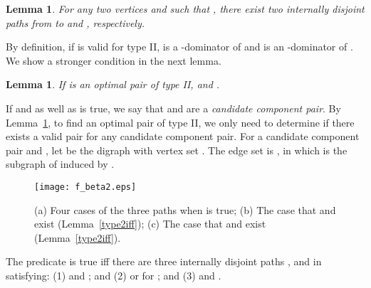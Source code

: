 \documentclass[review]{elsarticle}
\def\squarebox#1{\hbox to #1{\hfill\vbox to #1{\vfill}}}
\renewcommand{\qed}{\hspace*{\fill}
            \vbox{\hrule\hbox{\vrule\squarebox{.667em}\vrule}\hrule}\smallskip\newline}
\newtheorem{lem}[thm]{Lemma}
\begin{document}
\begin{lem}\label{2p1to2}
For any two vertices  and  such that , there
exist two internally disjoint paths from  to  and ,
respectively.
\end{lem}

By definition, if  is valid for type II,  is a
-dominator of  and  is an -dominator of . We
show a stronger condition in the next lemma.


\begin{lem}\label{type2b}
If  is an optimal pair of type II,  and
.
\end{lem}

If  and  as well as  is
true, we say that  and  are a {\em candidate component
pair}. By Lemma~\ref{type2b}, to find an optimal pair of type II, we
only need to determine if there exists a valid pair for any
candidate component pair. For a candidate component pair  and
, let  be the digraph with vertex set . The edge set is
, in which  is the subgraph of
 induced by .

\begin{figure}[t]
\begin{center}
\texttt{[image: f\_beta2.eps]}
\caption{{\rm (a)} Four cases of the three paths when  is true; {\rm (b)} The case that  and  exist ({\rm Lemma~\ref{type2iff}}); {\rm (c)} The case that  and  exist {\rm (Lemma~\ref{type2iff})}.}
\label{fbeta}
\end{center}
\end{figure}

\begin{defi}
The predicate  is true iff there are three internally
disjoint paths ,  and  in
 satisfying: (1)  and
; and (2)  or  for ; and (3)  and
.
\end{defi}
\end{document}
